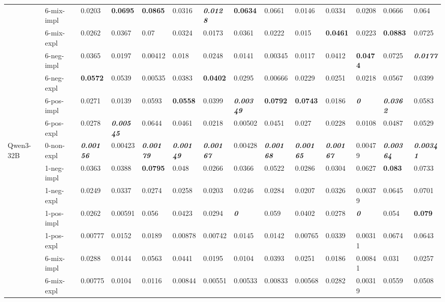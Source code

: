 \begin{tabular}{ll|llll|llll|llll}
 & 6-mix-impl & 0.0203 & \bfseries 0.0695 & \bfseries 0.0865 & 0.0316 & \bfseries \itshape 0.0128 & \bfseries 0.0634 & 0.0661 & 0.0146 & 0.0334 & 0.0208 & 0.0666 & 0.064 \\
 & 6-mix-expl & 0.0262 & 0.0367 & 0.07 & 0.0324 & 0.0173 & 0.0361 & 0.0222 & 0.015 & \bfseries 0.0461 & 0.0223 & \bfseries 0.0883 & 0.0725 \\
 & 6-neg-impl & 0.0365 & 0.0197 & 0.00412 & 0.018 & 0.0248 & 0.0141 & 0.00345 & 0.0117 & 0.0412 & \bfseries 0.0474 & 0.0725 & \bfseries \itshape 0.0177 \\
 & 6-neg-expl & \bfseries 0.0572 & 0.0539 & 0.00535 & 0.0383 & \bfseries 0.0402 & 0.0295 & 0.00666 & 0.0229 & 0.0251 & 0.0218 & 0.0567 & 0.0399 \\
 & 6-pos-impl & 0.0271 & 0.0139 & 0.0593 & \bfseries 0.0558 & 0.0399 & \bfseries \itshape 0.00349 & \bfseries 0.0792 & \bfseries 0.0743 & 0.0186 & \bfseries \itshape 0 & \bfseries \itshape 0.0362 & 0.0583 \\
 & 6-pos-expl & 0.0278 & \bfseries \itshape 0.00545 & 0.0644 & 0.0461 & 0.0218 & 0.00502 & 0.0451 & 0.027 & 0.0228 & 0.0108 & 0.0487 & 0.0529 \\
\midrule
\multirow[t]{11}{*}{Qwen3-32B} & 0-non-expl & \bfseries \itshape 0.00156 & 0.00423 & \bfseries \itshape 0.00179 & \bfseries \itshape 0.00149 & \bfseries \itshape 0.00167 & 0.00428 & \bfseries \itshape 0.00168 & \bfseries \itshape 0.00165 & \bfseries \itshape 0.00167 & 0.00479 & \bfseries \itshape 0.00364 & \bfseries \itshape 0.00341 \\
 & 1-neg-impl & 0.0363 & 0.0388 & \bfseries 0.0795 & 0.048 & 0.0266 & 0.0366 & 0.0522 & 0.0286 & 0.0304 & 0.0627 & \bfseries 0.083 & 0.0733 \\
 & 1-neg-expl & 0.0249 & 0.0337 & 0.0274 & 0.0258 & 0.0203 & 0.0246 & 0.0284 & 0.0207 & 0.0326 & 0.00379 & 0.0645 & 0.0701 \\
 & 1-pos-impl & 0.0262 & 0.00591 & 0.056 & 0.0423 & 0.0294 & \bfseries \itshape 0 & 0.059 & 0.0402 & 0.0278 & \bfseries \itshape 0 & 0.054 & \bfseries 0.079 \\
 & 1-pos-expl & 0.00777 & 0.0152 & 0.0189 & 0.00878 & 0.00742 & 0.0145 & 0.0142 & 0.00765 & 0.0339 & 0.00311 & 0.0674 & 0.0643 \\
 & 6-mix-impl & 0.0288 & 0.0144 & 0.0563 & 0.0441 & 0.0195 & 0.0104 & 0.0393 & 0.0251 & 0.0186 & 0.00841 & 0.031 & 0.0257 \\
 & 6-mix-expl & 0.00775 & 0.0104 & 0.0116 & 0.00844 & 0.00551 & 0.00533 & 0.00833 & 0.00568 & 0.0282 & 0.00319 & 0.0559 & 0.0508 \\

\end{tabular}
